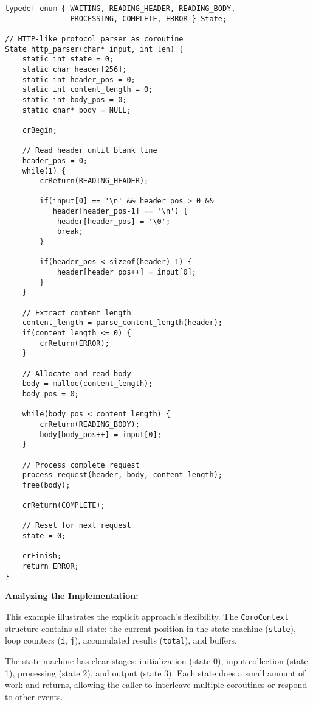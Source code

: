 \begin{lstlisting}
typedef enum { WAITING, READING_HEADER, READING_BODY,
               PROCESSING, COMPLETE, ERROR } State;

// HTTP-like protocol parser as coroutine
State http_parser(char* input, int len) {
    static int state = 0;
    static char header[256];
    static int header_pos = 0;
    static int content_length = 0;
    static int body_pos = 0;
    static char* body = NULL;

    crBegin;

    // Read header until blank line
    header_pos = 0;
    while(1) {
        crReturn(READING_HEADER);

        if(input[0] == '\n' && header_pos > 0 &&
           header[header_pos-1] == '\n') {
            header[header_pos] = '\0';
            break;
        }

        if(header_pos < sizeof(header)-1) {
            header[header_pos++] = input[0];
        }
    }

    // Extract content length
    content_length = parse_content_length(header);
    if(content_length <= 0) {
        crReturn(ERROR);
    }

    // Allocate and read body
    body = malloc(content_length);
    body_pos = 0;

    while(body_pos < content_length) {
        crReturn(READING_BODY);
        body[body_pos++] = input[0];
    }

    // Process complete request
    process_request(header, body, content_length);
    free(body);

    crReturn(COMPLETE);

    // Reset for next request
    state = 0;

    crFinish;
    return ERROR;
}
\end{lstlisting}

\vspace{0.3cm}
\noindent\textbf{Analyzing the Implementation:}

This example illustrates the explicit approach's flexibility. The \texttt{CoroContext} structure contains all state: the current position in the state machine (\texttt{state}), loop counters (\texttt{i}, \texttt{j}), accumulated results (\texttt{total}), and buffers.

The state machine has clear stages: initialization (state 0), input collection (state 1), processing (state 2), and output (state 3). Each state does a small amount of work and returns, allowing the caller to interleave multiple coroutines or respond to other events.

